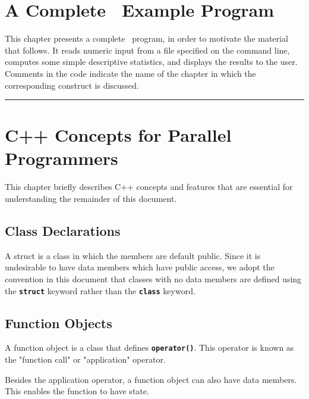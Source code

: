 \documentclass{report}
\begin{document}

\chapter{A Complete \stapl\ Example Program}

This chapter presents a complete \stapl\ program, in order to motivate
the material that follows.  It reads numeric input from a file specified
on the command line, computes some simple descriptive statistics, and
displays the results to the user.  Comments in the code indicate the
name of the chapter in which the corresponding construct is discussed.

\vspace{0.2cm}
\noindent
\rule{12cm}{0.5mm}
\vspace{0.2cm}




\chapter{C++ Concepts for Parallel Programmers}

This chapter briefly describes C++ concepts and features that are
essential for understanding the remainder of this document.

\section{Class Declarations}

A struct is a class in which the members are default public.
Since it is undesirable to have data members which have public access,
we adopt the convention in this document
that classes with no data members are defined using the
\texttt{{\bf struct}}
keyword rather than the
\texttt{{\bf class}}
keyword.

\section{Function Objects}

A function object is a class that defines
\texttt{{\bf operator()}}.
This operator is known as the "function call" or "application" operator.

Besides the application operator, a function object can also have
data members.  This enables the function to have state.
\end{document}
